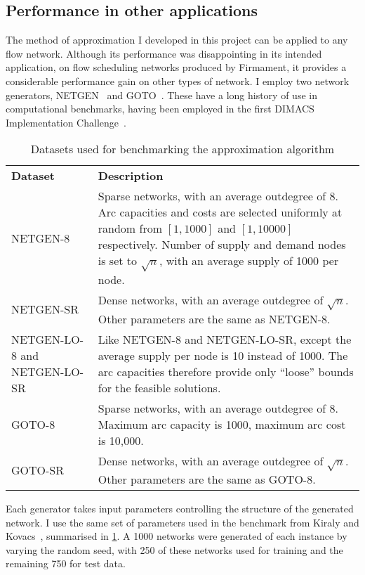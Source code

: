 \subsection{Performance in other applications}

The method of approximation I developed in this project can be applied to any flow network. Although its performance was disappointing in its intended application, on flow scheduling networks produced by Firmament, it provides a considerable performance gain on other types of network. I employ two network generators, NETGEN~\cite{Klingman:1974} and GOTO~\cite{GoldbergDIMACS:1993}. These have a long history of use in computational benchmarks, having been employed in the first DIMACS Implementation Challenge~\cite{DIMACSChallenge:Book}.

\begin{table}
    \centering
    \setlength{\tabcolsep}{1.5em}
    \begin{tabular}{p{}p{}}
        \textbf{Dataset} & \textbf{Description} \tabularnewline
        NETGEN-8 & Sparse networks, with an average outdegree of $8$. Arc capacities and costs are selected uniformly at random from $\left[1,1000\right]$ and $\left[1,10000\right]$ respectively. Number of supply and demand nodes is set to $\sqrt{n}$, with an average supply of 1000 per node. \tabularnewline
        NETGEN-SR & Dense networks, with an average outdegree of $\sqrt{n}$. Other parameters are the same as NETGEN-8. \tabularnewline
        NETGEN-LO-8 and NETGEN-LO-SR & Like NETGEN-8 and NETGEN-LO-SR, except the average supply per node is 10 instead of 1000. The arc capacities therefore provide only ``loose'' bounds for the feasible solutions. \tabularnewline
        GOTO-8 & Sparse networks, with an average outdegree of $8$. Maximum arc capacity is 1000, maximum arc cost is 10,000. \tabularnewline
        GOTO-SR & Dense networks, with an average outdegree of $\sqrt{n}$. Other parameters are the same as GOTO-8. \tabularnewline
    \end{tabular}
    \caption{Datasets used for benchmarking the approximation algorithm}
    \label{table:general-datasets}
\end{table}

Each generator takes input parameters controlling the structure of the generated network. I use the same set of parameters used in the benchmark from Kiraly and Kovacs~\cite{KiralyKovacs:2012}, summarised in \cref{table:general-datasets}. A 1000 networks were generated of each instance by varying the random seed, with 250 of these networks used for training and the remaining 750 for test data.

